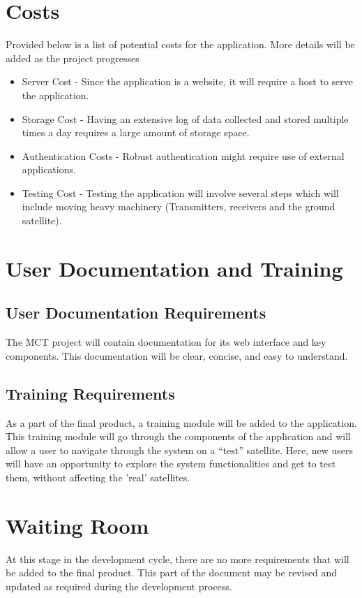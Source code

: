 \documentclass[12pt]{article}
\begin{document}
\section{Costs}
Provided below is a list of potential costs for the application. More details will be added as the project progresses
\begin{itemize}
    \item Server Cost - Since the application is a website, it will require a host to serve the application.
    \item Storage Cost - Having an extensive log of data collected and stored multiple times a day requires a large amount of storage space.

    \item Authentication Costs - Robust authentication might require use of external applications.
    \item Testing Cost - Testing the application will involve several steps which will include moving heavy machinery (Transmitters, receivers and the ground satellite).

\end{itemize}
\section{User Documentation and Training}
\subsection{User Documentation Requirements}
 The MCT project will contain documentation for its web interface and key components. This documentation will be clear, concise, and easy to understand.

\subsection{Training Requirements}
As a part of the final product, a training module will be added to the application. This training module will go through the components of the application and will allow a user to navigate through the system on a “test” satellite. Here, new users will have an opportunity to explore the system functionalities and get to test them, without affecting the 'real' satellites. 

\section{Waiting Room}
At this stage in the development cycle, there are no more requirements that will be added to the final product. This part of the document may be revised and updated as required during the development process.
\end{document}

